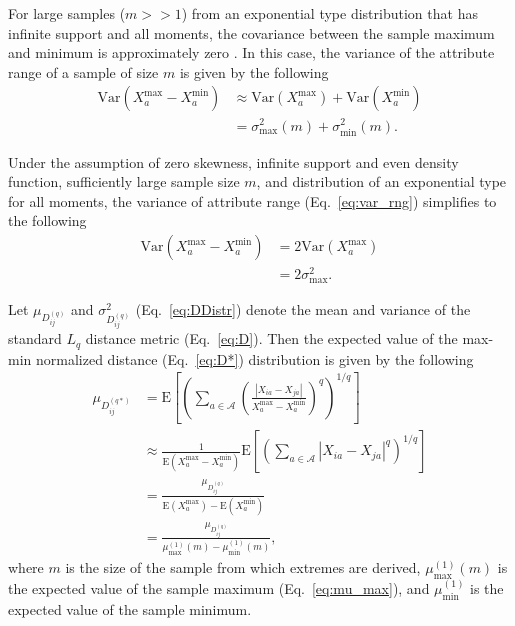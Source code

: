 \documentclass[aos]{imsart}
\begin{document}
For large samples ($m >> 1$) from an exponential type distribution that has infinite support and all moments, the covariance between the sample maximum and minimum is approximately zero \cite{gumbel1947}. In this case, the variance of the attribute range of a sample of size $m$ is given by the following
%
\begin{equation}\label{eq:var_rng}
\begin{aligned}
\text{Var}(X^\text{max}_a - X^\text{min}_a) &\approx \text{Var}(X^\text{max}_a) + \text{Var}(X^\text{min}_a) \\
&= \sigma^2_\text{max}(m) + \sigma^2_\text{min}(m).
\end{aligned}
\end{equation}

Under the assumption of zero skewness, infinite support and even density function, sufficiently large sample size $m$, and distribution of an exponential type for all moments, the variance of attribute range (Eq.~\ref{eq:var_rng}) simplifies to the following
%
\begin{equation}\label{eq:var_rng_symm}
\begin{aligned}
\text{Var}(X^\text{max}_a - X^\text{min}_a) &= 2 \text{Var}(X^\text{max}_a) \\
&= 2 \sigma^2_\text{max}.
\end{aligned}
\end{equation} 

Let $\mu_{D^{(q)}_{ij}}$ and $\sigma^2_{D^{(q)}_{ij}}$ (Eq.~\ref{eq:DDistr}) denote the mean and variance of the standard $L_q$ distance metric (Eq.~\ref{eq:D}). Then the expected value of the max-min normalized distance (Eq.~\ref{eq:D*}) distribution is given by the following
%
\begin{equation}\label{eq:max-min_D_mean}
\begin{aligned}
\mu_{D^{(q*)}_{ij}} &= \text{E}\left[\left(\sum_{a \in \mathcal{A}}\left(\frac{|X_{ia} - X_{ja}|}{X^\text{max}_a - X^\text{min}_a}\right)^q\right)^{1/q}\right] \\
&\approx \frac{1}{\text{E}(X^\text{max}_a - X^\text{min}_a)}\text{E}\left[\left(\sum_{a \in \mathcal{A}}|X_{ia} - X_{ja}|^q\right)^{1/q}\right] \\
&= \frac{\mu_{D^{(q)}_{ij}}}{\text{E}(X^\text{max}_a) - \text{E}(X^\text{min}_a)} \\
&= \frac{\mu_{D^{(q)}_{ij}}}{\mu^{(1)}_\text{max}(m) - \mu^{(1)}_\text{min}(m)},
\end{aligned}
\end{equation}
%
where $m$ is the size of the sample from which extremes are derived, $\mu^{(1)}_\text{max}(m)$ is the expected value of the sample maximum (Eq.~\ref{eq:mu_max}), and $\mu^{(1)}_\text{min}$ is the expected value of the sample minimum. 
\end{document}
